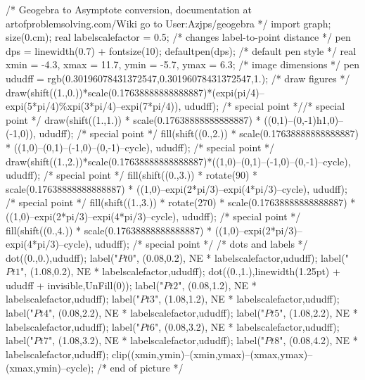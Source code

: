 /* Geogebra to Asymptote conversion, documentation at artofproblemsolving.com/Wiki go to User:Azjps/geogebra */
import graph; size(0.cm); 
real labelscalefactor = 0.5; /* changes label-to-point distance */
pen dps = linewidth(0.7) + fontsize(10); defaultpen(dps); /* default pen style */ real xmin = -4.3, xmax = 11.7, ymin = -5.7, ymax = 6.3;  /* image dimensions */
pen ududff = rgb(0.30196078431372547,0.30196078431372547,1.); 
 /* draw figures */
draw(shift((1.,0.))*scale(0.17638888888888887)*(expi(pi/4)--expi(5*pi/4)^^expi(3*pi/4)--expi(7*pi/4)), ududff); /* special point *//* special point */
draw(shift((1.,1.)) * scale(0.17638888888888887) * ((0,1)--(0,-1)^^(1,0)--(-1,0)), ududff); /* special point */
fill(shift((0.,2.)) * scale(0.17638888888888887) * ((1,0)--(0,1)--(-1,0)--(0,-1)--cycle), ududff); /* special point */
draw(shift((1.,2.))*scale(0.17638888888888887)*((1,0)--(0,1)--(-1,0)--(0,-1)--cycle), ududff); /* special point */
fill(shift((0.,3.)) * rotate(90) * scale(0.17638888888888887) * ((1,0)--expi(2*pi/3)--expi(4*pi/3)--cycle), ududff); /* special point */
fill(shift((1.,3.)) * rotate(270) * scale(0.17638888888888887) * ((1,0)--expi(2*pi/3)--expi(4*pi/3)--cycle), ududff); /* special point */
fill(shift((0.,4.)) * scale(0.17638888888888887) * ((1,0)--expi(2*pi/3)--expi(4*pi/3)--cycle), ududff); /* special point */
 /* dots and labels */
dot((0.,0.),ududff); 
label("$Pt0$", (0.08,0.2), NE * labelscalefactor,ududff); 
label("$Pt1$", (1.08,0.2), NE * labelscalefactor,ududff); dot((0.,1.),linewidth(1.25pt) + ududff + invisible,UnFill(0)); 
label("$Pt2$", (0.08,1.2), NE * labelscalefactor,ududff); 
label("$Pt3$", (1.08,1.2), NE * labelscalefactor,ududff); 
label("$Pt4$", (0.08,2.2), NE * labelscalefactor,ududff); 
label("$Pt5$", (1.08,2.2), NE * labelscalefactor,ududff); 
label("$Pt6$", (0.08,3.2), NE * labelscalefactor,ududff); 
label("$Pt7$", (1.08,3.2), NE * labelscalefactor,ududff); 
label("$Pt8$", (0.08,4.2), NE * labelscalefactor,ududff); 
clip((xmin,ymin)--(xmin,ymax)--(xmax,ymax)--(xmax,ymin)--cycle); 
 /* end of picture */
